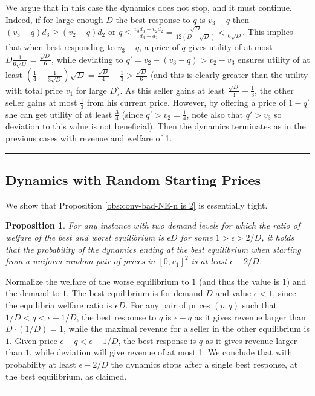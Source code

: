 \documentclass[11pt,a4paper]{article}
\newcommand{\qed}{\rule{1.5mm}{2mm}\vspace{0.1in}}
\newenvironment{proof}{\par\noindent{\bf Proof:}}{\qed}
\newtheorem{proposition}[theorem]{Proposition}
\begin{document}
\begin{proof}
    We argue that in this case the dynamics does not stop, and it must continue.
    Indeed, if for large enough $D$ the best response to $q$ is $v_3-q$ then $(v_3-q)d_3\geq (v_2-q)d_2$ or $q\leq \frac{v_3 d_3-v_2 d_2}{d_3-d_2} = \frac{\sqrt{D}}{12(D-\sqrt{D})}<\frac{1}{6\sqrt{D}}$.
    This implies that when best responding to $v_3-q$, a price of $q$ gives utility of at most $D\frac{1}{6\sqrt{D}}=\frac{\sqrt{D}}{6}$, while deviating to $q'= v_2-(v_3-q)>v_2-v_3$ ensures utility of at least $(\frac{1}{4}- \frac{1}{3\sqrt{D}}) \sqrt{D}= \frac{\sqrt{D}}{4}-\frac{1}{3}> \frac{\sqrt{D}}{6}$ (and this is clearly greater than the utility with total price $v_1$ for large $D$).
    As this seller gains at least $\frac{\sqrt{D}}{4}-\frac{1}{3}$,
    the other seller gains at most $\frac{1}{3}$ from his current price.
    However, by offering a price of $1-q'$ she can get utility of at least $\frac{3}{4}$ (since $q'>v_2=\frac{1}{4}$, note also that $q'>v_3$ so deviation to this value is not beneficial). Then the dynamics terminates as in the previous cases with revenue and welfare of 1.
\end{proof}


\subsection{Dynamics with Random Starting Prices}
\label{app:dynamic-random-prices}

We show that Proposition \ref{obs:conv-bad-NE-n is 2} is essentially tight.

\begin{proposition}
	\label{obs:conv-bad-NE-n is 2-tight}
	For any instance with two demand levels for which the ratio of welfare of the best and worst equilibrium is $\epsilon D$ for some  $1>\epsilon>2/D$, it holds that the probability of the dynamics ending at the best equilibrium when starting from a uniform random pair of prices in $[0,v_1]^2$ is at least $\epsilon-2/D$. 		%
\end{proposition}
\begin{proof}
	Normalize the welfare of the worse equilibrium to $1$ (and thus the value is $1$) and the demand to $1$.
	The best equilibrium is for demand $D$ and value $\epsilon<1$, since the equilibria welfare ratio is $\epsilon D$.
	For any pair of prices $(p,q)$ such that $1/D<q<\epsilon-1/D$,
	the best response to $q$ is $\epsilon-q$ as it gives revenue larger than
	$D\cdot (1/D)=1$, while the maximal revenue for a seller in the other equilibrium is $1$.
	Given price $\epsilon-q<\epsilon - 1/D$, the best response is $q$ as it gives revenue larger than $1$, while deviation will give revenue of at most 1.
	We conclude that with probability at least $\epsilon-2/D$ the dynamics stops after a single best response, at the best equilibrium, as claimed.
\end{proof}
\end{document}
